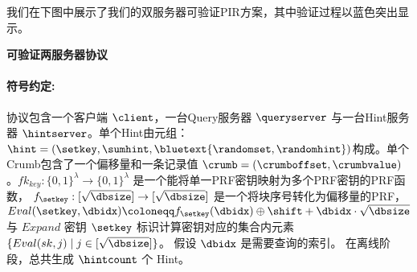 我们在下图中展示了我们的双服务器可验证PIR方案，其中验证过程以蓝色突出显示。

    \begin{mdframed}
        \centering
        \textbf{可验证两服务器协议}

        \raggedright
        \paragraph{符号约定:} 协议包含一个客户端 $\client$，一台Query服务器 $\queryserver$ 与一台Hint服务器 $\hintserver$。单个Hint由元组：$\hint=(\setkey,\sumhint,\bluetext{\randomset,\randomhint})$构成。单个Crumb包含了一个偏移量和一条记录值 $\crumb=(\crumboffset,\crumbvalue)$。$fk_{key}:\{0,1\}^\lambda \to \{0,1\}^\lambda$ 是一个能将单一PRF密钥映射为多个PRF密钥的PRF函数， $f_{\setkey}: [\sqrt{\dbsize}]\to [\sqrt{\dbsize}]$ 是一个将块序号转化为偏移量的PRF，  $Eval(\setkey,\dbidx) \coloneqq f_{\setkey}(\dbidx)\oplus \shift + \dbidx\cdot\sqrt{\dbsize}$ 与 $Expand$ 密钥 $\setkey$ 标识计算密钥对应的集合内元素 $\{Eval(sk,j) \mid j\in[\sqrt{\dbsize}]\}$。  假设 $\dbidx$ 是需要查询的索引。 在离线阶段，总共生成 $\hintcount$ 个 Hint。


\end{mdframed}
